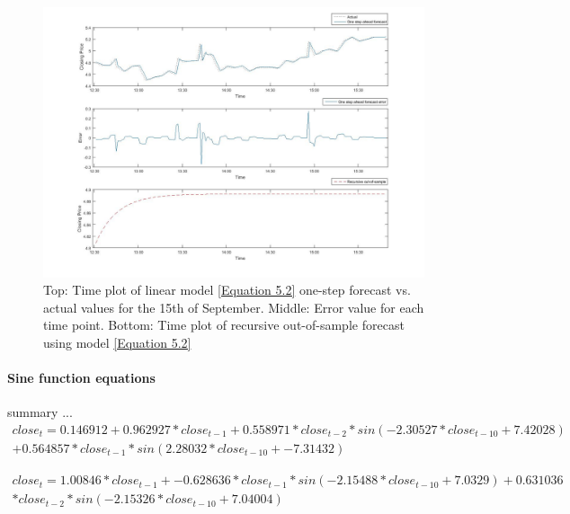 \documentclass[13pt]{report}
\begin{document}
\begin{figure}[H]
\centering
\label{VWlinear15fig}
\includegraphics[width=\textwidth]{15linear2}
\caption{Top: Time plot of linear model \ref{Equation 5.2} one-step forecast vs. actual values for the 15th of September. Middle: Error value for each time point. Bottom: Time plot of recursive out-of-sample forecast using model \ref{Equation 5.2}}
\end{figure}

\paragraph{Sine function equations}\hfill \break
summary ...
\begin{equation}
\begin{align*}
 close_{t} = 0.146912 + 0.962927 * close_{t-1} + 0.558971 * close_{t-2} *sin ( -2.30527 * close_{t-10} + 7.42028 ) \\+0.564857
             *close_{t-1} * sin ( 2.28032 * close_{t-10} + -7.31432 )   
\end{align*}
\label{Equation 5.3}
\end{equation}

\begin{equation}
\begin{align*}
close_{t} = 1.00846 * close_{t-1} + -0.628636 * close_{t-1} * sin ( -2.15488 * close_{t-10} + 7.0329 ) + 0.631036
\\ * close_{t-2} * sin ( -2.15326 * close_{t-10} + 7.04004 )
\end{align*}
\label{Equation 5.4}
\end{equation}
\end{document}
